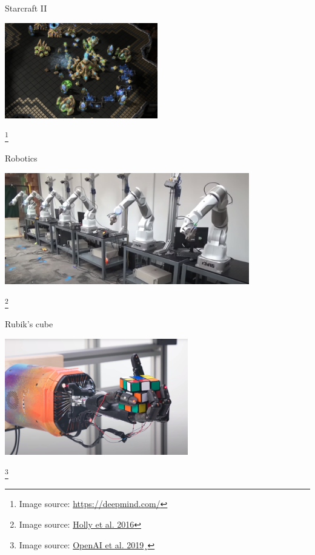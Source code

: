 \documentclass[aspectratio=169]{../latex_main/tntbeamer}  %
\begin{document}
\begin{frame}[c]{Starcraft II }
	
	\centering
	\includegraphics[width=0.5\textwidth]{images/starcraftii.png}
	
\footnote{Image source: \url{https://deepmind.com/}}
	
\end{frame}
\begin{frame}[c]{Robotics }
	
	\centering
	\includegraphics[width=0.8\textwidth]{images/robotic.png}
	
	\footnote{Image source: \href{https://www.youtube.com/watch?v=ZhsEKTo7V04}{Holly et al. 2016}}
	
\end{frame}
\begin{frame}[c]{Rubik's cube }
	
	\centering
	\includegraphics[width=0.6\textwidth]{images/rubiks_cube.png}
	
	\footnote{Image source: \href{https://openai.com/blog/solving-rubiks-cube/}{OpenAI et al. 2019}¸}
	
\end{frame}
\end{document}
